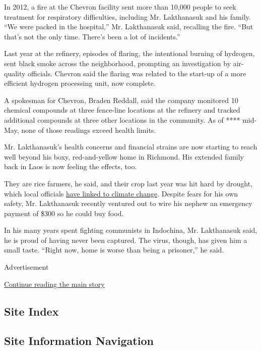 In 2012, a fire at the Chevron facility sent more than 10,000 people to
seek treatment for respiratory difficulties, including Mr. Lakthanasuk
and his family. ``We were packed in the hospital,'' Mr. Lakthanasuk
said, recalling the fire. ``But that's not the only time. There's been a
lot of incidents.''

Last year at the refinery, episodes of flaring, the intentional burning
of hydrogen, sent black smoke across the neighborhood, prompting an
investigation by air-quality officials. Chevron said the flaring was
related to the start-up of a more efficient hydrogen processing unit,
now complete.

A spokesman for Chevron, Braden Reddall, said the company monitored 10
chemical compounds at three fence-line locations at the refinery and
tracked additional compounds at three other locations in the community.
As of **** mid-May, none of those readings exceed health limits.

Mr. Lakthanasuk's health concerns and financial strains are now starting
to reach well beyond his boxy, red-and-yellow home in Richmond. His
extended family back in Laos is now feeling the effects, too.

They are rice farmers, he said, and their crop last year was hit hard by
drought, which local officials
\href{https://en.vietnamplus.vn/lao-ministry-blames-recent-droughts-on-climate-change/165553.vnp}{have
linked to climate change}. Despite fears for his own safety, Mr.
Lakthanasuk recently ventured out to wire his nephew an emergency
payment of \$300 so he could buy food.

In his many years spent fighting communists in Indochina, Mr.
Lakthanasuk said, he is proud of having never been captured. The virus,
though, has given him a small taste. ``Right now, home is worse than
being a prisoner,'' he said.

Advertisement

\protect\hyperlink{after-bottom}{Continue reading the main story}

\hypertarget{site-index}{%
\subsection{Site Index}\label{site-index}}

\hypertarget{site-information-navigation}{%
\subsection{Site Information
Navigation}\label{site-information-navigation}}

